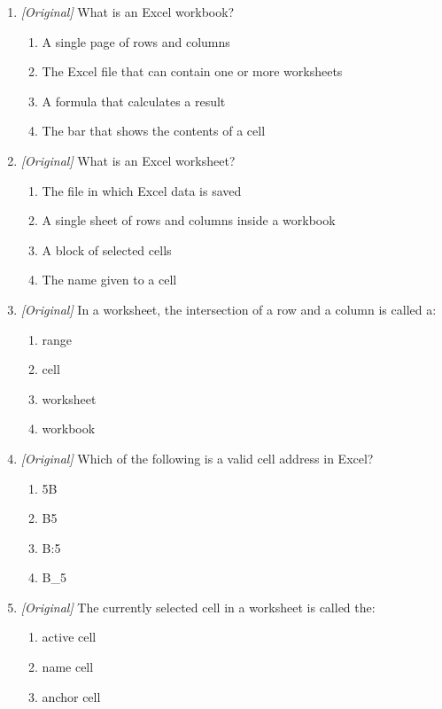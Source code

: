 \begin{enumerate}[label=\textbf{Q\arabic*.}, leftmargin=*]
\item \textit{[Original]} What is an Excel workbook?
  \begin{enumerate}[label=\Alph*.]
    \item A single page of rows and columns
    \item The Excel file that can contain one or more worksheets
    \item A formula that calculates a result
    \item The bar that shows the contents of a cell
  \end{enumerate}
\item \textit{[Original]} What is an Excel worksheet?
  \begin{enumerate}[label=\Alph*.]
    \item The file in which Excel data is saved
    \item A single sheet of rows and columns inside a workbook
    \item A block of selected cells
    \item The name given to a cell
  \end{enumerate}
\item \textit{[Original]} In a worksheet, the intersection of a row and a
  column is called a:
  \begin{enumerate}[label=\Alph*.]
    \item range
    \item cell
    \item worksheet
    \item workbook
  \end{enumerate}
\item \textit{[Original]} Which of the following is a valid cell address in
  Excel?
  \begin{enumerate}[label=\Alph*.]
    \item 5B
    \item B5
    \item B:5
    \item B\_5
  \end{enumerate}
\item \textit{[Original]} The currently selected cell in a worksheet is
  called the:
  \begin{enumerate}[label=\Alph*.]
    \item active cell
    \item name cell
    \item anchor cell

\end{enumerate}
\end{enumerate}
